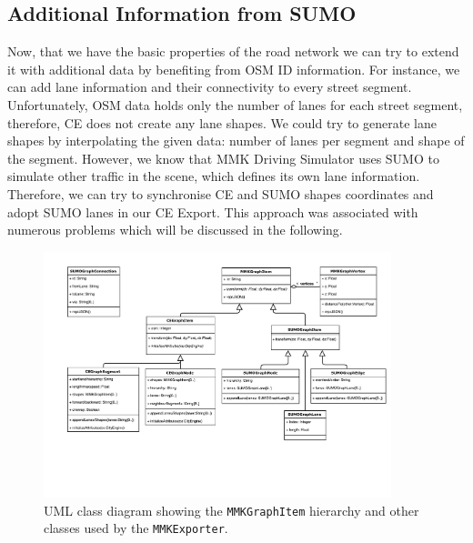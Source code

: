 \subsection{Additional Information from SUMO}

Now, that we have the basic properties of the road network we can try to extend it with additional data by benefiting from OSM ID information. For instance, we can add lane information and their connectivity to every street segment. Unfortunately, OSM data holds only the number of lanes for each street segment, therefore, CE does not create any lane shapes. We could try to generate lane shapes by interpolating the given data: number of lanes per segment and shape of the segment. However, we know that MMK Driving Simulator uses SUMO to simulate other traffic in the scene, which defines its own lane information. Therefore, we can try to synchronise CE and SUMO shapes coordinates and adopt SUMO lanes in our CE Export. This approach was associated with numerous problems which will be discussed in the following.

\begin{figure}[htb]
	\centering
	\includegraphics[width=0.9\textwidth]{figures/ce-uml}
	\caption{UML class diagram showing the \texttt{MMKGraphItem} hierarchy and other classes used by the \texttt{MMKExporter}.}
	\label{fig:ce-uml}
\end{figure}

